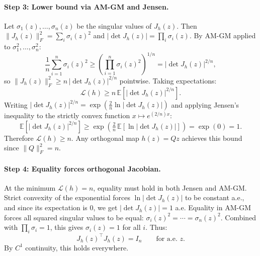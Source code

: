 \paragraph{Step 3: Lower bound via AM-GM and Jensen.}
Let $\sigma_1(z), \ldots, \sigma_n(z)$ be the singular values of $J_h(z)$. Then $\|J_h(z)\|_F^2 = \sum_i \sigma_i(z)^2$ and $|\det J_h(z)| = \prod_i \sigma_i(z)$. By AM-GM applied to $\sigma_1^2, \ldots, \sigma_n^2$:
\begin{equation}
    \frac{1}{n}\sum_{i=1}^n \sigma_i(z)^2 \geq \left(\prod_{i=1}^n \sigma_i(z)^2\right)^{1/n} = |\det J_h(z)|^{2/n},
\end{equation}
so $\|J_h(z)\|_F^2 \geq n\,|\det J_h(z)|^{2/n}$ pointwise. Taking expectations:
\begin{equation}
    \mathcal{L}(h) \geq n\,\mathbb{E}\!\left[|\det J_h(z)|^{2/n}\right].
\end{equation}
Writing $|\det J_h(z)|^{2/n} = \exp\!\left(\tfrac{2}{n}\ln|\det J_h(z)|\right)$ and applying Jensen's inequality to the strictly convex function $x \mapsto e^{(2/n)x}$:
\begin{equation}
    \mathbb{E}\!\left[|\det J_h(z)|^{2/n}\right] \geq \exp\!\left(\tfrac{2}{n}\,\mathbb{E}\!\left[\ln|\det J_h(z)|\right]\right) = \exp(0) = 1.
\end{equation}
Therefore $\mathcal{L}(h) \geq n$. Any orthogonal map $h(z) = Qz$ achieves this bound since $\|Q\|_F^2 = n$.

\paragraph{Step 4: Equality forces orthogonal Jacobian.}
At the minimum $\mathcal{L}(h) = n$, equality must hold in both Jensen and AM-GM. Strict convexity of the exponential forces $\ln|\det J_h(z)|$ to be constant a.e., and since its expectation is 0, we get $|\det J_h(z)| = 1$ a.e. Equality in AM-GM forces all squared singular values to be equal: $\sigma_i(z)^2 = \cdots = \sigma_n(z)^2$. Combined with $\prod_i \sigma_i = 1$, this gives $\sigma_i(z) = 1$ for all $i$. Thus:
\begin{equation}
    J_h(z)^\top J_h(z) = I_n \qquad \text{for a.e.\ } z.
\end{equation}
By $C^1$ continuity, this holds everywhere.

